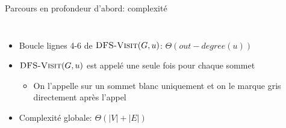 \begin{frame}{Parcours en profondeur d'abord: complexité}

\begin{columns}
\begin{column}{5cm}
\begin{center}
{\small
{}
}
\end{center}
\end{column}
\begin{column}{5cm}
\begin{center}
{\small
{}
}
\end{center}
\end{column}
\end{columns}

\bigskip

\begin{itemize}
\item Boucle lignes 4-6 de $\textnormal{\scshape DFS-Visit}(G,u)$: $\Theta(out-degree(u))$
\item $\textnormal{\scshape DFS-Visit}(G,u)$ est appelé une seule fois pour chaque sommet
\begin{itemize}
\item On l'appelle sur un sommet blanc uniquement et on le marque gris directement après l'appel
\end{itemize}
\item Complexité globale: $\Theta(|V|+|E|)$
\end{itemize}


\end{frame}

